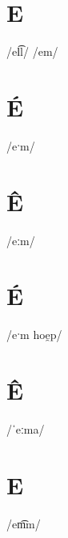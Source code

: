 \documentclass[10pt,a4paper,twoside]{book}
\begin{document}
\section*{E}

\begin{multicols}{3}
 {/el͡l/} {}
 {/em/} {}
\end{multicols}

\section*{É}

\begin{multicols}{3}
 {/eˑm/} {}
\end{multicols}

\section*{Ê}

\begin{multicols}{3}
 {/eːm/} {}
\end{multicols}

\section*{É}

\begin{multicols}{3}
 {/eˑm hoe̯p/} {}
\end{multicols}

\section*{Ê}

\begin{multicols}{3}
 {/ˈeːma/} {}
\end{multicols}

\section*{E}

\begin{multicols}{3}
 {/em͡m/} {}
\end{multicols}
\end{document}

